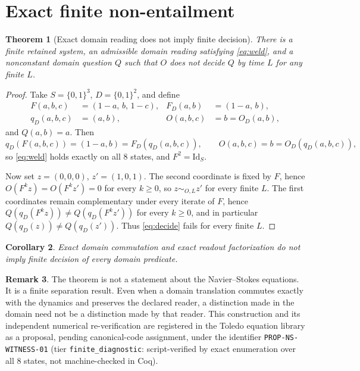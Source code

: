 \documentclass[11pt]{article}
\theoremstyle{plain}
\newtheorem{theorem}{Theorem}
\newtheorem{corollary}[theorem]{Corollary}
\theoremstyle{definition}
\newtheorem{remark}[theorem]{Remark}
\begin{document}
\section{Exact finite non-entailment}

\begin{theorem}[Exact domain reading does not imply finite decision]\label{thm:witness}
There is a finite retained system, an admissible domain reading satisfying \eqref{eq:weld}, and a
nonconstant domain question $Q$ such that $O$ does not decide $Q$ by time $L$ for any finite $L$.
\end{theorem}

\begin{proof}
Take $S = \{0,1\}^3$, $D=\{0,1\}^2$, and define
\begin{align}
  F(a,b,c) &= (1-a,\,b,\,1-c), & F_D(a,b) &= (1-a,\,b), \\
  q_D(a,b,c) &= (a,b), & O(a,b,c) &= b = O_D(a,b),
\end{align}
and $Q(a,b) = a$. Then
\[
  q_D(F(a,b,c)) = (1-a,b) = F_D(q_D(a,b,c)), \qquad O(a,b,c) = b = O_D(q_D(a,b,c)),
\]
so \eqref{eq:weld} holds exactly on all $8$ states, and $F^2=\mathrm{Id}_S$.

Now set $z=(0,0,0)$, $z'=(1,0,1)$. The second coordinate is fixed by $F$, hence
$O(F^k z) = O(F^k z') = 0$ for every $k\ge 0$, so $z\sim_{O,L}z'$ for every finite $L$. The first
coordinates remain complementary under every iterate of $F$, hence
$Q(q_D(F^k z)) \ne Q(q_D(F^k z'))$ for every $k\ge 0$, and in particular
$Q(q_D(z))\ne Q(q_D(z'))$. Thus \eqref{eq:decide} fails for every finite $L$.
\end{proof}

\begin{corollary}\label{cor:witness}
Exact domain commutation and exact readout factorization do not imply finite decision of every
domain predicate.
\end{corollary}

\begin{remark}
The theorem is not a statement about the Navier--Stokes equations. It is a finite separation
result. Even when a domain translation commutes exactly with the dynamics and preserves the
declared reader, a distinction made in the domain need not be a distinction made by that reader.
This construction and its independent numerical re-verification are registered in the Toledo
equation library as a proposal, pending canonical-code assignment, under the identifier
\texttt{PROP-NS-WITNESS-01} (tier \texttt{finite\_diagnostic}: script-verified
by exact enumeration over all $8$ states, not machine-checked in Coq).
\end{remark}
\end{document}
